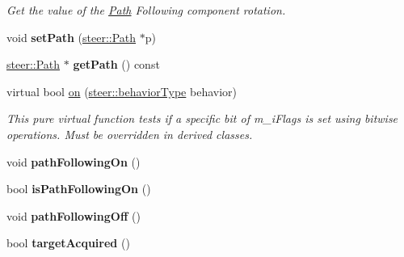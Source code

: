\begin{DoxyCompactItemize}
\begin{DoxyCompactList}\small\item\em Get the value of the \hyperlink{classsteer_1_1_path}{Path} Following component rotation. \end{DoxyCompactList}\item 
\hypertarget{classsteer_1_1_path_following_component_a7059cf601823298f88be089b9b066d39}{void {\bfseries set\-Path} (\hyperlink{classsteer_1_1_path}{steer\-::\-Path} $\ast$p)}\label{classsteer_1_1_path_following_component_a7059cf601823298f88be089b9b066d39}

\item 
\hypertarget{classsteer_1_1_path_following_component_a6bc0a5a3aeac0df2f4d1bf2782834b4d}{\hyperlink{classsteer_1_1_path}{steer\-::\-Path} $\ast$ {\bfseries get\-Path} () const }\label{classsteer_1_1_path_following_component_a6bc0a5a3aeac0df2f4d1bf2782834b4d}

\item 
virtual bool \hyperlink{classsteer_1_1_path_following_component_af15d403db80ac9d623d6fc4ec6f6701b}{on} (\hyperlink{namespacesteer_afe6e72f8f8088962727051501181acbe}{steer\-::behavior\-Type} behavior)
\begin{DoxyCompactList}\small\item\em This pure virtual function tests if a specific bit of m\-\_\-i\-Flags is set using bitwise operations. Must be overridden in derived classes. \end{DoxyCompactList}\item 
\hypertarget{classsteer_1_1_path_following_component_a7b795c82dd889c9b15965486b41f1dee}{void {\bfseries path\-Following\-On} ()}\label{classsteer_1_1_path_following_component_a7b795c82dd889c9b15965486b41f1dee}

\item 
\hypertarget{classsteer_1_1_path_following_component_a19cf5261b9483f2a8ec8fe83328bd516}{bool {\bfseries is\-Path\-Following\-On} ()}\label{classsteer_1_1_path_following_component_a19cf5261b9483f2a8ec8fe83328bd516}

\item 
\hypertarget{classsteer_1_1_path_following_component_a36b3fdf6732f58cdb96159cd47acc7f8}{void {\bfseries path\-Following\-Off} ()}\label{classsteer_1_1_path_following_component_a36b3fdf6732f58cdb96159cd47acc7f8}

\item 
\hypertarget{classsteer_1_1_path_following_component_a196c16619b471663b4a53e39def2cdca}{bool {\bfseries target\-Acquired} ()}\label{classsteer_1_1_path_following_component_a196c16619b471663b4a53e39def2cdca}


\end{DoxyCompactItemize}

